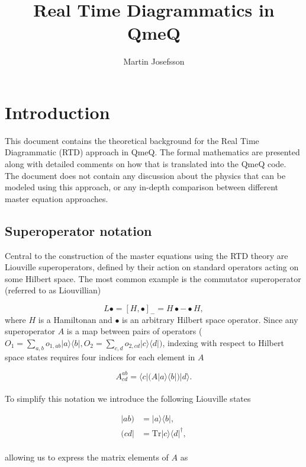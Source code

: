 \documentclass{article}
\title{Real Time Diagrammatics in QmeQ}
\author{Martin Josefsson}
\newcommand{\oph}[2]{\ensuremath{|#1\rangle\langle#2|}}
\newcommand{\bra}[1]{\ensuremath{\langle #1 |}}
\newcommand{\ket}[1]{\ensuremath{|#1\rangle}}
\newcommand{\bral}[1]{\ensuremath{( #1 |}}
\newcommand{\ketl}[1]{\ensuremath{|#1)}}
\begin{document}
\maketitle
\section{Introduction}
This document contains the theoretical background for the Real Time Diagrammatic (RTD) approach in QmeQ. The formal mathematics are presented along with detailed comments on how that is translated into the QmeQ code. The document does not contain any discussion about the physics that can be modeled using this approach, or any in-depth comparison between different master equation approaches. 
\subsection{Superoperator notation}
Central to the construction of the master equations using the RTD theory are Liouville superoperators, defined by their action on standard operators acting on some Hilbert space. The most common example is the commutator superoperator (referred to as Liouvillian)

\begin{equation}
    L\bullet = [H, \bullet]_- = H\bullet-\bullet H,
\end{equation}
where $H$ is a Hamiltonan and $\bullet$ is an arbitrary Hilbert space operator.  Since any superoperator $A$ is a map between pairs of operators ($O_1 = \sum_{a,b}o_{1,ab}|a\rangle\langle b|,  O_2 = \sum_{c,d}o_{2,cd}|c\rangle\langle d|)$, indexing with respect to Hilbert space states requires four indices for each element in $A$

\begin{equation}
	A^{ab}_{cd} = \bra{c} \Big ( A \oph{a}{b} \Big  )\ket{d}.
    \label{Eq:MatrixElement}
\end{equation}
\\
To simplify this notation we introduce the following Liouville states 

\begin{align}
	\ketl{ab} &= \oph{a}{b}, \\
	\bral{cd} &= \text{Tr}\oph{c}{d}^\dagger,
\end{align}
\\
allowing us to express the matrix elements of $A$ as 
\end{document}
